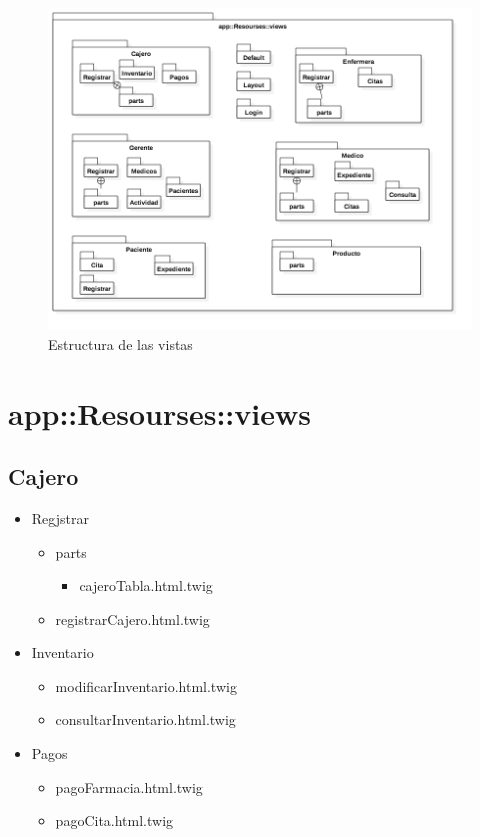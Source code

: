 	\begin{figure}[htbp!]
		\centering
			\includegraphics[width=1\textwidth]{images/logico33}
		\caption{Estructura de las vistas}
	\end{figure}
	\newpage
	\section{app::Resourses::views}
		\subsection{Cajero}
		\begin{itemize}
			\item Regjstrar
			\begin{itemize}
				\item parts
				\begin{itemize}
					\item cajeroTabla.html.twig
				\end{itemize}
				\item registrarCajero.html.twig
			\end{itemize}
			\item Inventario
			\begin{itemize}
				\item modificarInventario.html.twig
				\item consultarInventario.html.twig
			\end{itemize}
			\item Pagos
			\begin{itemize}
				\item pagoFarmacia.html.twig
				\item pagoCita.html.twig
			\end{itemize}
		\end{itemize}
